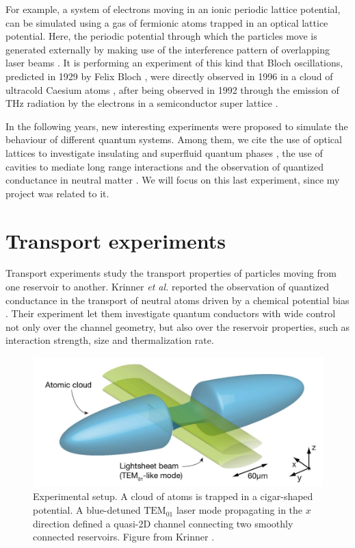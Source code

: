 For example, a system of electrons moving in an ionic periodic lattice potential, can be simulated using a gas of fermionic atoms trapped in an optical lattice potential. Here, the periodic potential
through which the particles move is generated externally by making
use of the interference pattern of overlapping laser beams \cite{bloch2008}. It is performing an experiment of this kind that Bloch oscillations, predicted in 1929 by Felix Bloch \cite{bloch1929a}, were directly observed in 1996 in a cloud of ultracold Caesium atoms \cite{dahan1996}, after being observed in 1992 through the emission of THz radiation by the electrons in a semiconductor super lattice \cite{feldmann1992}.

In the following years, new interesting experiments were proposed to simulate the behaviour of different quantum systems. Among them, we cite the use of optical lattices to investigate insulating and superfluid quantum phases \cite{greiner2002}, the use of cavities to mediate long range interactions \cite{landig2016} and the observation of quantized conductance in neutral matter \cite{krinner2015}. We will focus on this last experiment, since my project was related to it.

\section{Transport experiments}
Transport experiments study the transport properties of particles moving from one reservoir to another. Krinner \emph{et al.} reported the observation of quantized conductance in the transport of neutral atoms driven by a chemical potential bias \cite{krinner2015}. Their experiment let them investigate
quantum conductors with wide control not only over the channel
geometry, but also over the reservoir properties, such as interaction strength, size and thermalization rate.

\begin{figure}
    \includegraphics[width=\textwidth]{chapters/chapter_1/figures/reservoir.png}
    \caption{Experimental setup. A cloud of atoms is trapped in a cigar-shaped potential. A blue-detuned $\text{TEM}_{01}$ laser mode propagating in the $x$ direction defined a quasi-2D channel connecting two smoothly connected reservoirs. Figure from Krinner \cite{krinner2015}.}
    \label{fig:lithium_apparatus}
\end{figure}

